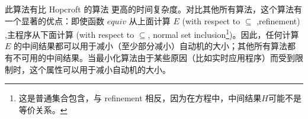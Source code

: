 此算法有比 Hopcroft 的算法 \cite{Hopc71,Grie73} 更高的时间复杂度。对比其他所有算法，这个算法有一个显著的优点：即使函数 $equiv$ 从上面计算 $E$ (with respect to $\subseteq$ ,refinement) ,主程序从下面计算 (with respect to $ \subseteq $, normal set inclusion\footnote{这是普通集合包含，与 refinement 相反，因为在方程中，中间结果$H$可能不是等价关系。})。因此，任何计算 $E$ 的中间结果都可以用于减小（至少部分减小）自动机的大小；其他所有算法都有不可用的中间结果。当最小化算法由于某些原因（比如实时应用程序）而受到限制时，这个属性可以用于减小自动机的大小。

